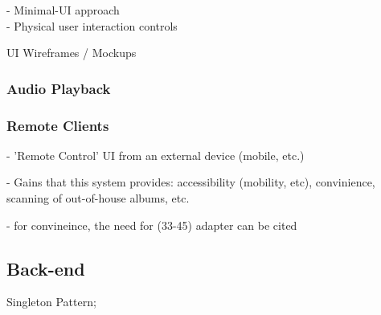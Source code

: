                 \begin{temp}
                    - Minimal-UI approach \\
                    - Physical user interaction controls
                \end{temp}
    
                \begin{temp}
                    UI Wireframes / Mockups
                \end{temp}
    
                
            
            \subsubsection{Audio Playback}
        
            \subsubsection{Remote Clients}
    
                \begin{temp}
                    - 'Remote Control' UI from an external device (mobile, etc.)
                    
                    - Gains that this system provides: accessibility (mobility, etc), convinience, scanning of out-of-house albums, etc.
    
                    - for convineince, the need for (33-45) adapter  can be cited
                \end{temp}
        
        \subsection{Back-end}
    
            \begin{temp}
                Singleton Pattern;
            \end{temp}
        
